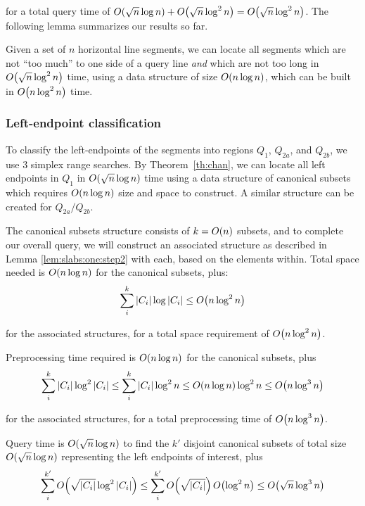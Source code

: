 \noindent
for a total query time of $O\!\left(\sqrt{n}\log{n}\right) + O\!\left(\sqrt{n}\log^2{n}\right) = O\!\left(\sqrt{n}\log^2{n}\right)$. The following lemma summarizes our results so far.

\begin{lemma}
\label{lem:slabs:one:step2}
Given a set of $n$ horizontal line segments, we can locate all segments which are not ``too much'' to one side of a query line \emph{and} which are not too long in $O\!\left(\sqrt{n}\log^2{n}\right)$ time, using a data structure of size $O\!\left(n\log{n}\right)$, which can be built in $O\!\left(n\log^2{n}\right)$ time.
\end{lemma}


\subsubsection{Left-endpoint classification}

To classify the left-endpoints of the segments into regions $Q_1$, $Q_{2a}$, and $Q_{2b}$, we use 3 simplex range searches. By Theorem~\ref{th:chan}, we can locate all left endpoints in $Q_1$ in $O\!\left(\sqrt{n}\log{n}\right)$ time using a data structure of canonical subsets which requires $O\!\left(n \log{n}\right)$ size and space to construct. A similar structure can be created for $Q_{2a}/Q_{2b}$.

The canonical subsets structure consists of $k = O\!\left(n\right)$ subsets, and to complete our overall query, we will construct an associated structure as described in Lemma \ref{lem:slabs:one:step2} with each, based on the elements within. Total space needed is $O\!\left(n \log{n}\right)$ for the canonical subsets, plus:
\[
\sum_{i}^{k}{|C_i| \log{|C_i|}} \leq O\!\left(n\log^2{n}\right)
\]

\noindent for the associated structures, for a total space requirement of $O\!\left(n\log^2{n}\right)$.

Preprocessing time required is $O\!\left(n \log{n}\right)$ for the canonical subsets, plus
\[
\sum_{i}^{k}{|C_i| \log^2{|C_i|}} 
\leq \sum_{i}^{k}{|C_i| \log^2{n}} 
\leq O\!\left(n\log{n}\right) \log^2{n}
\leq O\!\left(n \log^3{n}\right)
\]

\noindent
for the associated structures, for a total preprocessing time of $O\!\left(n \log^3{n}\right)$.

Query time is $O\!\left(\sqrt{n}\log{n}\right)$ to find the $k'$ disjoint canonical subsets of total size $O\!\left(\sqrt{n}\log{n}\right)$ representing the left endpoints of interest, plus
\[
\sum_{i}^{k'}{O\!\left(\sqrt{|C_i|}\log^2{|C_i|}\right)} 
\leq \sum_{i}^{k'}{O\!\left(\sqrt{|C_i|}\right)O\!\left(\log^2{n}\right)} 
\leq O\!\left(\sqrt{n}\log^3{n}\right)
\]

